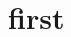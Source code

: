 \documentclass[11pt]{ltjsarticle}
\begin{document}
\title{}
\author{1710693 渡辺大智}
\maketitle

\section{first}

\begin{thebibliography}{99}
\end{thebibliography}
\end{document}
